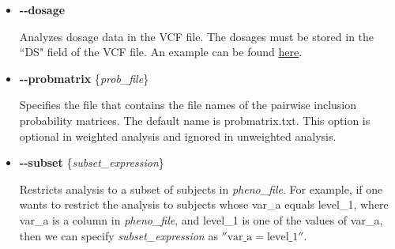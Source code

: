 \documentclass[12pt,letter]{article}
\begin{document}
\begin{itemize}
\item {\bf -{}-dosage}

Analyzes dosage data in the VCF file. The dosages must be stored in
the ``DS" field of the VCF file. An example can be found 
\href{http://genome.sph.umich.edu/wiki/RAREMETALWORKER}{here}.

\item {\bf -{}-probmatrix} \{{\it prob\_file}\}

Specifies the file that contains the file names of the pairwise inclusion probability matrices. 
The default name is {\ttfamily probmatrix.txt}. This option is optional
in weighted analysis and ignored in unweighted analysis.

\item {\bf -{}-subset} \{{\it subset\_expression}\}

Restricts analysis to a subset of subjects in {\it pheno\_file}. For example, 
if one wants to restrict the analysis to subjects whose {\ttfamily var\_a} equals 
{\ttfamily level\_1}, where {\ttfamily var\_a} is a column
in {\it pheno\_file}, and {\ttfamily level\_1} is one of the values of {\ttfamily var\_a},
then we can specify {\it subset\_expression} as {\ttfamily $''\text{var\_a}=\text{level\_1}''$}.


\end{itemize}
\end{document}
